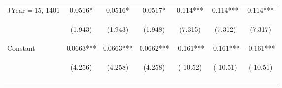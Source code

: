 \documentclass[]{article}
\begin{document}
\begin{center}
\begin{tabular}{lcccccc}
JYear = 15, 1401 & 0.0516* & 0.0516* & 0.0517* & 0.114*** & 0.114*** & 0.114*** \\
\vspace{4pt} & \begin{footnotesize}(1.943)\end{footnotesize} & \begin{footnotesize}(1.943)\end{footnotesize} & \begin{footnotesize}(1.948)\end{footnotesize} & \begin{footnotesize}(7.315)\end{footnotesize} & \begin{footnotesize}(7.312)\end{footnotesize} & \begin{footnotesize}(7.317)\end{footnotesize} \\
Constant & 0.0663*** & 0.0663*** & 0.0662*** & -0.161*** & -0.161*** & -0.161*** \\
 & \begin{footnotesize}(4.256)\end{footnotesize} & \begin{footnotesize}(4.258)\end{footnotesize} & \begin{footnotesize}(4.258)\end{footnotesize} & \begin{footnotesize}(-10.52)\end{footnotesize} & \begin{footnotesize}(-10.51)\end{footnotesize} & \begin{footnotesize}(-10.51)\end{footnotesize} \\
\vspace{4pt} & \begin{footnotesize}\end{footnotesize} & \begin{footnotesize}\end{footnotesize} & \begin{footnotesize}\end{footnotesize} & \begin{footnotesize}\end{footnotesize} & \begin{footnotesize}\end{footnotesize} & \begin{footnotesize}\end{footnotesize} \\

\end{tabular}
\end{center}
\end{document}
